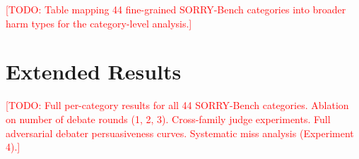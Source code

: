\documentclass[preprint]{article}
\newcommand{\todo}[1]{\textcolor{red}{[TODO: #1]}}
\begin{document}
\todo{Table mapping 44 fine-grained SORRY-Bench categories into broader harm types for the category-level analysis.}

\section{Extended Results}
\label{app:extended}

\todo{Full per-category results for all 44 SORRY-Bench categories. Ablation on number of debate rounds (1, 2, 3). Cross-family judge experiments. Full adversarial debater persuasiveness curves. Systematic miss analysis (Experiment 4).}
\end{document}
